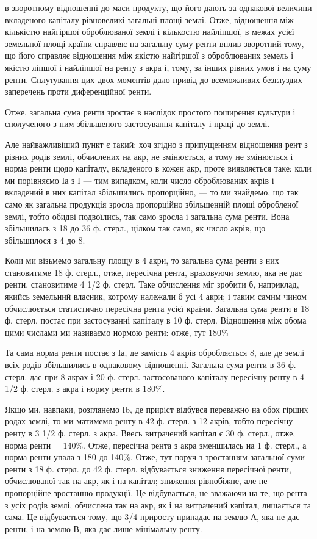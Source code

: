 \parcont{}  %
в зворотному відношенні до маси продукту, що його дають за однакової величини
вкладеного капіталу рівновеликі загальні площі землі. Отже, відношення між
кількістю найгіршої оброблюваної землі і кількостю найліпшої, в межах усієї
земельної площі країни справляє на загальну суму ренти вплив зворотний
тому, що його справляє відношення між якістю найгіршої з оброблюваних земель
і якістю ліпшої і найліпшої на ренту з акра і, тому, за інших рівних
умов і на суму ренти. Сплутування цих двох моментів дало привід до всеможливих
безглуздих заперечень проти диференційної ренти.

Отже, загальна сума ренти зростає в наслідок простого поширення культури
і сполученого з ним збільшеного застосування капіталу і праці до землі.

Але найважливіший пункт є такий: хоч згідно з припущенням відношення
рент з різних родів землі, обчислених на акр, не змінюється, а тому
не змінюється і норма ренти щодо капіталу, вкладеного в кожен акр, проте
виявляється таке: коли ми порівняємо Іа з І — тим випадком, коли число оброблюваних
акрів і вкладений в них капітал збільшились пропорційно, — то ми знайдемо,
що так само як загальна продукція зросла пропорційно збільшенній площі
обробленої землі, тобто обидві подвоїлись, так само зросла і загальна сума ренти.
Вона збільшилась з 18 до 36 ф. стерл., цілком так само, як число акрів, що
збільшилося з 4 до 8.

Коли ми візьмемо загальну площу в 4 акри, то загальна сума ренти з них
становитиме 18 ф. стерл., отже, пересічна рента, враховуючи землю, яка не дає
ренти, становитиме 4 1/2 ф. стерл. Таке обчислення міг зробити б, наприклад,
якийсь земельний власник, котрому належали б усі 4 акри; і таким самим
чином обчислюється статистично пересічна рента усієї країни. Загальна сума
ренти в 18 ф. стерл. постає при застосуванні капіталу в 10 ф. стерл.
Відношення між обома цими числами ми називаємо нормою ренти: отже, тут
180\%

Та сама норма ренти постає з Іа, де замість 4 акрів обробляється 8,
але де землі всіх родів збільшились в однаковому відношенні. Загальна сума
ренти в 36 ф. стерл. дає при 8 акрах і 20 ф. стерл. застосованого капіталу
пересічну ренту в 4 1/2 ф. стерл. з акра і норму ренти в 180\%.

Якщо ми, навпаки, розглянемо Іb, де приріст відбувся переважно на обох
гірших родах землі, то ми матимемо ренту в 42 ф. стерл. з 12 акрів, тобто
пересічну ренту в 3 1/2 ф. стерл. з акра. Ввесь витрачений капітал є 30 ф. стерл.,
отже, норма ренти = 140\%. Отже, пересічна рента з акра зменшилась на 1 ф.
стерл., а норма ренти упала з 180 до 140\%. Отже, тут поруч з зростанням
загальної суми ренти з 18 ф. стерл. до 42 ф. стерл. відбувається зниження
пересічної ренти, обчислюваної так на акр, як і на капітал; зниження рівнобіжне,
але не пропорційне зростанню продукції. Це відбувається, не зважаючи на те,
що рента з усіх родів землі, обчислена так на акр, як і на витрачений капітал,
лишається та сама. Це відбувається тому, що 3/4 приросту припадає на
землю А, яка не дає ренти, і на землю В, яка дає лише мінімальну ренту.

